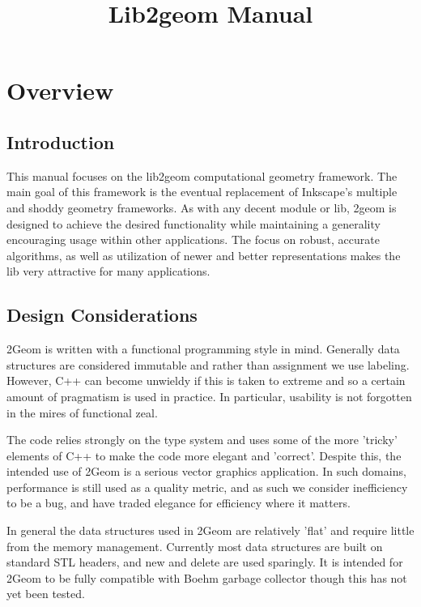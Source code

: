\documentclass[openany]{book}
\title{Lib2geom Manual}
\begin{document}
\maketitle{}

\chapter{Overview}

\section{Introduction}

This manual focuses on the lib2geom computational geometry framework.
The main goal of this framework is the eventual replacement of
Inkscape's multiple and shoddy geometry frameworks. As with any decent
module or lib, 2geom is designed to achieve the desired functionality
while maintaining a generality encouraging usage within other
applications.  The focus on robust, accurate algorithms, as well as
utilization of newer and better representations makes the lib
very attractive for many applications.

\section{Design Considerations}
2Geom is written with a functional programming style in mind.
Generally data structures are considered immutable and rather than
assignment we use labeling.  However, C++ can become unwieldy if
this is taken to extreme and so a certain amount of pragmatism is
used in practice.  In particular, usability is not forgotten in the
mires of functional zeal.

The code relies strongly on the type system and uses some of the more
'tricky' elements of C++ to make the code more elegant and 'correct'.
Despite this, the intended use of 2Geom is a serious vector graphics
application. In such domains, performance is still used as a quality
metric, and as such we consider inefficiency to be a bug, and have
traded elegance for efficiency where it matters.

In general the data structures used in 2Geom are relatively 'flat'
and require little from the memory management.  Currently most data
structures are built on standard STL headers\cite{stl}, and new and
delete are used sparingly.  It is intended for 2Geom to be fully
compatible with Boehm garbage collector\cite{boehm} though this has
not yet been tested.
\end{document}
